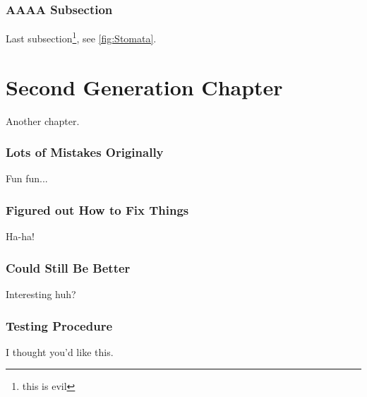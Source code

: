 \documentclass[letterpaper,12pt]{article}
\begin{document}
\subsection{AAAA Subsection}
Last subsection\footnote{this is evil}, see \ref{fig:Stomata}.


% 
% 
% 
% 



\chapter{Second Generation Chapter}
\label{cha:important-chapter}
Another chapter.

\subsection{Lots of Mistakes Originally}
Fun fun...

\subsection{Figured out How to Fix Things}
Ha-ha!

\subsection{Could Still Be Better}
Interesting huh?

\subsection{Testing Procedure}
I thought you'd like this.
\end{document}
